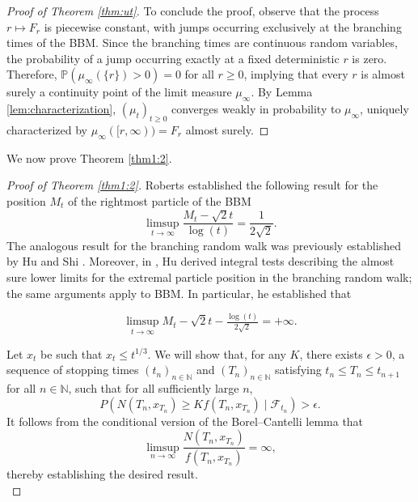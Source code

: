 \documentclass{article}
\begin{document}
\begin{proof}[Proof of Theorem \ref{thm:ut}]
    To conclude the proof, observe that the process $r \mapsto F_r$ is piecewise constant, with jumps occurring exclusively at the branching times of the BBM. Since the branching times are continuous random variables, the probability of a jump occurring exactly at a fixed deterministic $r$ is zero. Therefore, $\mathbb{P}(\mu_\infty(\{r\}) > 0) = 0$ for all $r \ge 0$, implying that every $r$ is almost surely a continuity point of the limit measure $\mu_\infty$. By Lemma \ref{lem:characterization}, $(\mu_t)_{t \ge 0}$ converges weakly in probability to $\mu_\infty$, uniquely characterized by $\mu_\infty([r, \infty)) = F_r$ almost surely.
\end{proof}

We now prove Theorem \ref{thm1:2}.
\begin{proof}[Proof of Theorem \ref{thm1:2}]
Roberts \cite{Roberts_2013} established the following result for the position $M_t$ of the rightmost particle of the BBM 
\begin{equation}
    \limsup_{t\to \infty}\frac{M_t - \sqrt{2}t}{\log(t)}=\frac{1}{2\sqrt{2}}.
\end{equation}
The analogous result for the branching random walk was previously established by Hu and Shi \cite{hushi}. Moreover, in \cite{Hu2012TheAS}, Hu derived integral tests describing the almost sure lower limits for the extremal particle position in the branching random walk; the same arguments apply to BBM. In particular, he established that 

\begin{equation}\label{eq:Husup}
    \limsup_{t\to \infty} M_t -\sqrt{2}t -\tfrac{\log(t)}{2\sqrt{2}}= +\infty.
\end{equation}

Let $x_t$ be such that $x_t\leq t^{1/3}$. We will show that, for any $K$, there exists $\epsilon>0$, a sequence of stopping times $(t_n)_{n\in \mathbb{N}}$ and $(T_n)_{n\in \mathbb{N}}$ satisfying $t_n\leq T_n\leq t_{n+1}$ for all $n\in \mathbb{N}$,  such that for all sufficiently large $n$,
\begin{equation}
    P\left(N(T_n,x_{T_n})\geq Kf(T_n,x_{T_n}) \mid \mathcal{F}_{t_n}\right) >\epsilon.
\end{equation}
It follows from the conditional version of the Borel–Cantelli lemma that
\begin{equation}
    \limsup_{n\to \infty}\frac{N(T_n,x_{T_n})}{f(T_n,x_{T_n})} = \infty,
\end{equation}
thereby establishing the desired result.\\


\end{proof}
\end{document}
